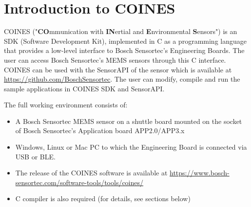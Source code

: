 \documentclass{article}
\begin{document}
\section{Introduction to COINES}

COINES ("\textbf{CO}mmunication with \textbf{IN}ertial and \textbf{E}nvironmental \textbf{S}ensors") is an SDK (Software Development Kit), implemented in C as a programming language that provides a low-level interface to Bosch Sensortec's Engineering Boards. The user can access Bosch Sensortec's MEMS sensors through this C interface. COINES can be used with the SensorAPI of the sensor which is available at \url{https://github.com/BoschSensortec}. The user can modify, compile and run the sample applications in COINES SDK and SensorAPI.


The full working environment consists of:
\begin{itemize}
	\item A Bosch Sensortec MEMS sensor on a shuttle board mounted on the socket of Bosch Sensortec's Application board APP2.0/APP3.x
	\item Windows, Linux or Mac PC to which the Engineering Board is connected via USB or BLE.
	\item The release of the COINES software is available at \url{https://www.bosch-sensortec.com/software-tools/tools/coines/}
	\item C compiler is also required (for details, see sections below)
\end{itemize}
\end{document}
